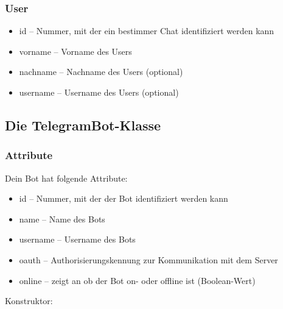 \documentclass[a4paper]{article}
\begin{document}
		\subsubsection{User}
		\begin{itemize}
			\item id -- Nummer, mit der ein bestimmer Chat identifiziert werden kann
			\item vorname -- Vorname des Users
			\item nachname -- Nachname des Users (optional)
			\item username -- Username des Users (optional)
		\end{itemize}
		
		\subsection{Die TelegramBot-Klasse}
		\subsubsection{Attribute}
Dein Bot hat folgende Attribute:
		\begin{itemize}
			\item id -- Nummer, mit der der Bot identifiziert werden kann
			\item name -- Name des Bots
			\item username -- Username des Bots
			\item oauth -- Authorisierungskennung zur Kommunikation mit dem Server
			\item online -- zeigt an ob der Bot on- oder offline ist (Boolean-Wert)
		\end{itemize}
		Konstruktor:
\end{document}

